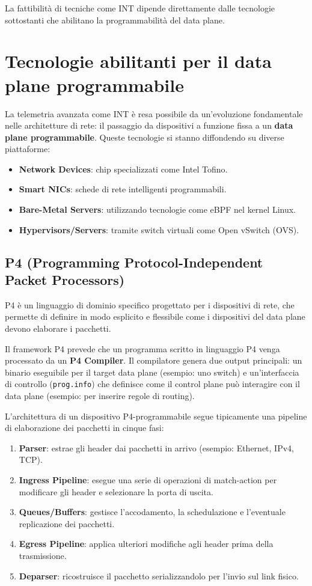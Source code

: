 La fattibilità di tecniche come INT dipende direttamente dalle tecnologie
sottostanti che abilitano la programmabilità del data plane.

\section{Tecnologie abilitanti per il data plane programmabile}

La telemetria avanzata come INT è resa possibile da un'evoluzione fondamentale
nelle architetture di rete: il passaggio da dispositivi a funzione fissa a
un \textbf{data plane programmabile}. Queste tecnologie si stanno diffondendo
su diverse piattaforme:

\begin{itemize}
\item \textbf{Network Devices}: chip specializzati come Intel Tofino.
\item \textbf{Smart NICs}: schede di rete intelligenti programmabili.
\item \textbf{Bare-Metal Servers}: utilizzando tecnologie come eBPF nel
kernel Linux.
\item \textbf{Hypervisors/Servers}: tramite switch virtuali come
Open vSwitch (OVS).
\end{itemize}

\subsection{P4 (Programming Protocol-Independent Packet Processors)}

P4 è un linguaggio di dominio specifico progettato per i dispositivi di rete,
che permette di definire in modo esplicito e flessibile come i dispositivi
del data plane devono elaborare i pacchetti.

Il framework P4 prevede che un programma scritto in linguaggio P4 venga
processato da un \textbf{P4 Compiler}. Il compilatore genera due output
principali: un binario eseguibile per il target data plane (esempio: uno switch)
e un'interfaccia di controllo (\texttt{prog.info}) che definisce come il
control plane può interagire con il data plane (esempio: per inserire
regole di routing).

L'architettura di un dispositivo P4-programmabile segue tipicamente una
pipeline di elaborazione dei pacchetti in cinque fasi:

\begin{enumerate}
\item \textbf{Parser}: estrae gli header dai pacchetti in arrivo
(esempio: Ethernet, IPv4, TCP).
\item \textbf{Ingress Pipeline}: esegue una serie di operazioni di
match-action per modificare gli header e selezionare la porta di uscita.
\item \textbf{Queues/Buffers}: gestisce l'accodamento, la schedulazione
e l'eventuale replicazione dei pacchetti.
\item \textbf{Egress Pipeline}: applica ulteriori modifiche agli header
prima della trasmissione.
\item \textbf{Deparser}: ricostruisce il pacchetto serializzandolo per
l'invio sul link fisico.
\end{enumerate}

